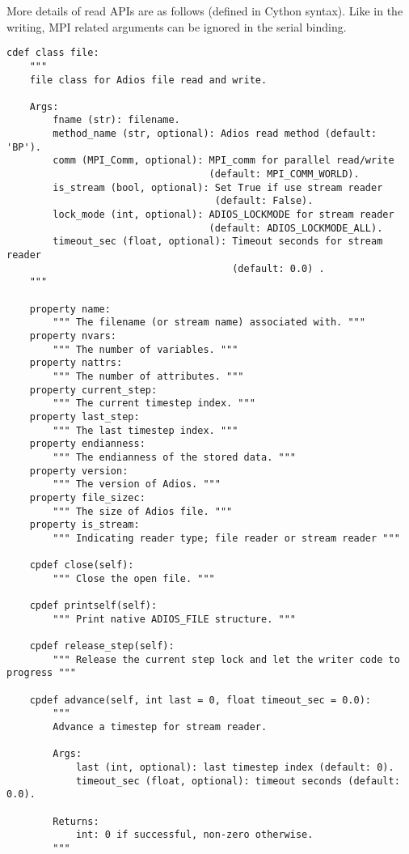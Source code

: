 More details of read APIs are as follows (defined in Cython syntax). Like in the writing, MPI related arguments can be ignored in the serial binding.
\begin{lstlisting}[language=cython,caption={Read functions},label={},]
cdef class file:
    """
    file class for Adios file read and write.

    Args:
        fname (str): filename.
        method_name (str, optional): Adios read method (default: 'BP').
        comm (MPI_Comm, optional): MPI_comm for parallel read/write 
                                   (default: MPI_COMM_WORLD).
        is_stream (bool, optional): Set True if use stream reader 
                                    (default: False).
        lock_mode (int, optional): ADIOS_LOCKMODE for stream reader 
                                   (default: ADIOS_LOCKMODE_ALL).
        timeout_sec (float, optional): Timeout seconds for stream reader
                                       (default: 0.0) .
    """

    property name:
        """ The filename (or stream name) associated with. """
    property nvars:
        """ The number of variables. """
    property nattrs:
        """ The number of attributes. """
    property current_step:
        """ The current timestep index. """
    property last_step:
        """ The last timestep index. """
    property endianness:
        """ The endianness of the stored data. """
    property version:
        """ The version of Adios. """
    property file_sizec:
        """ The size of Adios file. """
    property is_stream:
        """ Indicating reader type; file reader or stream reader """

    cpdef close(self):
        """ Close the open file. """
        
    cpdef printself(self):
        """ Print native ADIOS_FILE structure. """

    cpdef release_step(self):
        """ Release the current step lock and let the writer code to progress """
        
    cpdef advance(self, int last = 0, float timeout_sec = 0.0):
        """
        Advance a timestep for stream reader.

        Args:
            last (int, optional): last timestep index (default: 0).
            timeout_sec (float, optional): timeout seconds (default: 0.0).

        Returns:
            int: 0 if successful, non-zero otherwise.
        """
        

\end{lstlisting}

